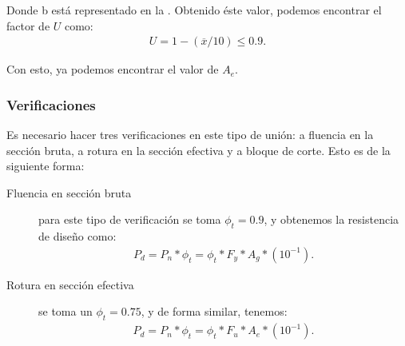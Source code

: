 \documentclass[../main.tex]{subfiles}
\begin{document}
Donde b está representado en la . Obtenido éste valor, podemos
encontrar el factor de $U$ como:
 \begin{align*}
   U = 1 - (\overline{x} / 10) \leq 0.9
.\end{align*}

Con esto, ya podemos encontrar el valor de $A_e$.

\subsubsection{Verificaciones}

Es necesario hacer tres verificaciones en este tipo de unión: a fluencia en la
sección bruta, a rotura en la sección efectiva y a bloque de corte. Esto es 
de la siguiente forma:

\begin{description}
  \item[Fluencia en sección bruta] para este tipo de verificación se toma 
    $\phi_t=0.9$, y obtenemos la resistencia de diseño como:
    \begin{align*}
      P_d = P_n * \phi_t = \phi_t * F_y * A_g * (10^{-1})
    .\end{align*}

  \item[Rotura en sección efectiva] se toma un $\phi_t = 0.75$, y de forma 
    similar, tenemos:
    \begin{align*}
      P_d = P_n * \phi_t = \phi_t * F_u * A_e * (10^{-1})
    .\end{align*}


\end{description}
\end{document}

